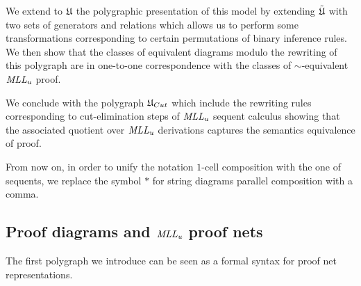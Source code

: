 \documentclass[a4paper]{article}
\begin{document}
We extend to $\mathfrak{U}$ the polygraphic presentation of this model  by extending ${\tilde{\mathfrak{U}}}$ with two sets of generators and relations which allows us to perform some transformations corresponding to certain permutations of binary inference rules. We then show that the classes of equivalent diagrams modulo the rewriting of this polygraph are in one-to-one correspondence with the classes of $\sim$-equivalent $\mathit{MLL_u}$ proof.

We conclude with the polygraph $\mathfrak{U}_{Cut}$ which include the rewriting rules corresponding to cut-elimination steps of $\mathit{MLL_u}$ sequent calculus showing that the associated quotient over $\mathit{MLL_u}$ derivations captures the semantics equivalence of proof.

\nota From now on, in order to unify the notation $1$-cell composition with the one of sequents, we replace the symbol $*$ for string diagrams parallel composition with a comma.


\subsection{Proof diagrams and $\mathit{MLL_u}$ proof nets}
 
The first polygraph we introduce can be seen as a formal syntax for proof net representations.
\end{document}
